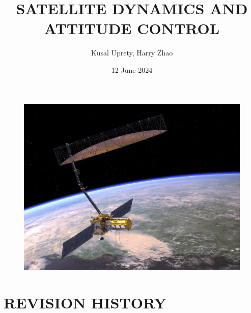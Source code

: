 \documentclass[12pt,a4paper,notitlepage]{article}
\begin{document}
\title{\Huge \textbf{SATELLITE DYNAMICS AND ATTITUDE CONTROL}}
\author{Kusal Uprety, Harry Zhao}
\date{12 June 2024}

\begin{minipage}[h]{\textwidth}
	\vspace{4 cm}
	\advance\leftskip-1in
    \maketitle
\end{minipage}

\begin{figure}[H]
\centering
\includegraphics[scale=0.45]{Images/NISAR.jpg}
\end{figure}

\pagebreak

\section*{\Large REVISION HISTORY}
\end{document}
